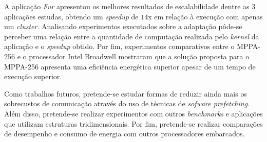 \documentclass[12pt]{article}
\newcommand{\mppa}{MPPA-256\xspace}
\begin{document}
A aplicação \textit{Fur} apresentou os melhores resultados de escalabilidade
dentre as 3 aplicações estudas, obtendo um \textit{speedup} de $14$x em relação
à execução com apenas um \textit{cluster}. Analisando experimentos executados sobre a
adaptação pôde-se perceber uma relação entre a quantidade de computação
realizada pelo \textit{kernel} da aplicação e o \textit{speedup} obtido. Por
fim, experimentos comparativos entre o \mppa e o processador Intel Broadwell
mostraram que a solução proposta para o \mppa apresenta uma eficiência
energética superior apesar de um tempo de execução superior.

Como trabalhos futuros, pretende-se estudar formas de reduzir ainda mais os
sobrecustos de comunicação através do uso de técnicas de \textit{sofware
    prefetching}. Além disso, pretende-se realizar experimentos com outros
\textit{benchmarks} e aplicações que utilizam estruturas tridimensionais. Por
fim, pretende-se realizar comparações de desempenho e consumo de energia com
outros processadores embarcados.




\end{document}
